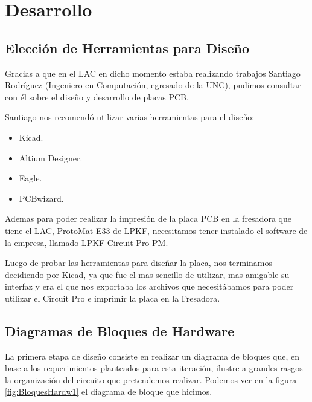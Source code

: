 
\section{Desarrollo} %
\label{sec:desarrollo}

\subsection{Elección de Herramientas para Diseño} %
\label{sec:herramientas_para_diseno}

Gracias a que en el LAC en dicho momento estaba realizando trabajos Santiago Rodríguez (Ingeniero en Computación, egresado de la UNC), pudimos consultar con él sobre el diseño y desarrollo de placas PCB. 

Santiago nos recomendó utilizar varias herramientas para el diseño:
\begin{itemize}
\item Kicad.
\item Altium Designer.
\item Eagle.
\item PCBwizard.
\end{itemize}

Ademas para poder realizar la impresión de la placa PCB en la fresadora que tiene el LAC, ProtoMat E33 de LPKF, necesitamos tener instalado el software de la empresa, llamado LPKF Circuit Pro PM.

Luego de probar las herramientas para diseñar la placa, nos terminamos decidiendo por Kicad, ya que fue el mas sencillo de utilizar, mas amigable su interfaz y era el que nos exportaba los archivos que necesitábamos para poder utilizar el Circuit Pro e imprimir la placa en la Fresadora.


\subsection{Diagramas de Bloques de Hardware}
\label{diagra_bloques_hardware}

La primera etapa de diseño consiste en realizar un diagrama de bloques que, en base a los requerimientos planteados para esta iteración, ilustre a grandes rasgos la organización del circuito que pretendemos realizar.
Podemos ver en la figura \ref{fig:BloquesHardw1} el diagrama de bloque que hicimos.

